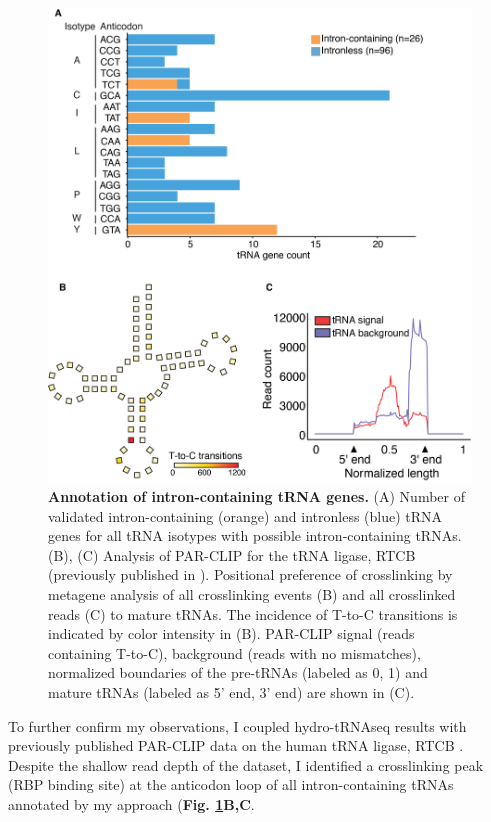 \documentclass[12pt]{rockefeller}
\begin{document}
\newpage
\begin{figure}[!hb]%
\centering
\includegraphics[width=\textwidth]{paper5.png}%
\caption[Annotation of intron-containing tRNA genes.]
{\textbf{Annotation of intron-containing tRNA genes.}
(A) Number of validated intron-containing (orange) and intronless (blue) tRNA genes for all tRNA isotypes with possible intron-containing tRNAs. (B), (C) Analysis of PAR-CLIP for the tRNA ligase, RTCB (previously published in \cite{Baltz:2012bh}). Positional preference of crosslinking by metagene analysis of all crosslinking events (B) and all crosslinked reads (C) to mature tRNAs. The incidence of T-to-C transitions is indicated by color intensity in (B). PAR-CLIP signal (reads containing T-to-C), background (reads with no mismatches), normalized boundaries of the pre-tRNAs (labeled as 0, 1) and mature tRNAs (labeled as 5’ end, 3’ end) are shown in (C).
}
\centering
\label{paper5}%
\end{figure}

To further confirm my observations, I coupled hydro-tRNAseq results with previously published PAR-CLIP data on the human tRNA ligase, RTCB \cite{Baltz:2012bh}. Despite the shallow read depth of the dataset, I identified a crosslinking peak (RBP binding site) at the anticodon loop of all intron-containing tRNAs annotated by my approach (\textbf{Fig. \ref{paper5}B,C}. 
\end{document}
